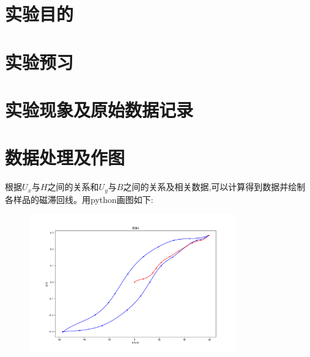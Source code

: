 \documentclass[signature=data]{physicsreport}
\begin{document}
\maketitle

\section{实验目的}
\section{实验预习}


\makeatletter
{}
\makeatother


\section{实验现象及原始数据记录}


\makeatletter
{}
\makeatother

\newpage
\section{数据处理及作图}

根据$U_x$与$H$之间的关系和$U_y$与$B$之间的关系及相关数据,可以计算得到数据并绘制各样品的磁滞回线。用python画图如下:

\begin{figure}[H]
    \centering
    \includegraphics[width=0.8\textwidth]{images/lab15/Figure_1.png}
\end{figure}
\end{document}
